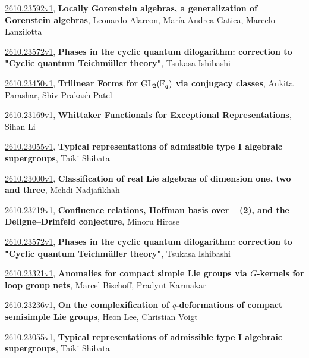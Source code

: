 \documentclass[9pt, a4paper]{article}
\theoremstyle{plain}
\theoremstyle{definition}
\theoremstyle{remark}
\newcommand{\arxiv}[3]{\href{https://arxiv.org/abs/#1}{#1}, \textbf{\textcolor{arxivblue}{#2}}, #3}
\begin{document}
\arxiv{2610.23592v1}{Locally Gorenstein algebras, a generalization of Gorenstein algebras}{Leonardo Alarcon, María Andrea Gatica, Marcelo Lanzilotta}

\arxiv{2610.23572v1}{Phases in the cyclic quantum dilogarithm: correction to "Cyclic quantum Teichmüller theory"}{Tsukasa Ishibashi}

\arxiv{2610.23450v1}{Trilinear Forms for ${\rm GL}_2(\mathbb{F}_q)$ via conjugacy classes}{Ankita Parashar, Shiv Prakash Patel}

\arxiv{2610.23169v1}{Whittaker Functionals for Exceptional Representations}{Sihan Li}

\arxiv{2610.23055v1}{Typical representations of admissible type I algebraic supergroups}{Taiki Shibata}

\arxiv{2610.23000v1}{Classification of real Lie algebras of dimension one, two and three}{Mehdi Nadjafikhah}

\arxiv{2610.23719v1}{Confluence relations, Hoffman basis over \mathbb{Z}_{(2)}, and the Deligne--Drinfeld conjecture}{Minoru Hirose}

\arxiv{2610.23572v1}{Phases in the cyclic quantum dilogarithm: correction to "Cyclic quantum Teichmüller theory"}{Tsukasa Ishibashi}

\arxiv{2610.23321v1}{Anomalies for compact simple Lie groups via $G$-kernels for loop group nets}{Marcel Bischoff, Pradyut Karmakar}

\arxiv{2610.23236v1}{On the complexification of $ q $-deformations of compact semisimple Lie groups}{Heon Lee, Christian Voigt}

\arxiv{2610.23055v1}{Typical representations of admissible type I algebraic supergroups}{Taiki Shibata}

\end{document}
